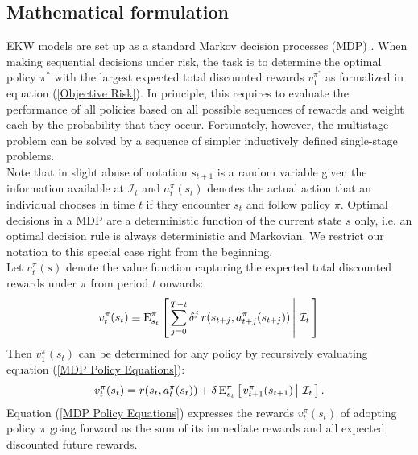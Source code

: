 \subsection{Mathematical formulation}\label{Mathematics}
EKW models are set up as a standard Markov decision processes (MDP) \citep{Puterman.1994,White.1993}. When making sequential decisions under risk, the task is to determine the optimal policy $\pi^*$ with the largest expected total discounted rewards $v^{\pi^*}_1$ as formalized in equation (\ref{Objective Risk}). In principle, this requires to evaluate the performance of all policies based on all possible sequences of rewards and weight each by the probability that they occur. Fortunately, however, the multistage problem can be solved by a sequence of simpler inductively defined single-stage problems.\\

\noindent Note that in slight abuse of notation $s_{t + 1}$ is a random variable given the information available at $\mathcal{I}_t$ and $a^\pi_{t}(s_{t})$ denotes the actual action that an individual chooses in time $t$ if they encounter $s_{t}$ and follow policy $\pi$. Optimal decisions in a MDP are a deterministic function of the current state $s$ only, i.e. an optimal decision rule is always deterministic and Markovian. We
restrict our notation to this special case right from the beginning.\\

\noindent Let $v^\pi_t(s)$ denote the value function capturing the expected total discounted rewards under $\pi$ from period $t$ onwards:
%
\begin{align*}
  v^\pi_t(s_t) \equiv \mathrm{E}_{s_t}^\pi\left[\left.\sum^{T - t}_{j = 0}  \delta^j\, r(s_{t + j}, a^\pi_{t + j}(s_{t + j})) \,\right\vert\,\mathcal{I}_t\,\right]
\end{align*}
%
Then $v_1^\pi(s_t)$ can be determined for any policy by recursively evaluating equation (\ref{MDP Policy Equations}):
%
\begin{align}\label{MDP Policy Equations}
v^\pi_t(s_t) = r(s_t,  a^\pi_t(s_t)) + \delta\,\mathrm{E}^\pi_{s_t} \left[\left.v^\pi_{t + 1}(s_{t + 1})  \,\right\vert\,\mathcal{I}_t\,\right].
\end{align}
%
Equation (\ref{MDP Policy Equations}) expresses the rewards $v^\pi_t(s_t)$ of adopting policy $\pi$ going forward as the sum of its immediate rewards and all expected discounted future rewards.\\

